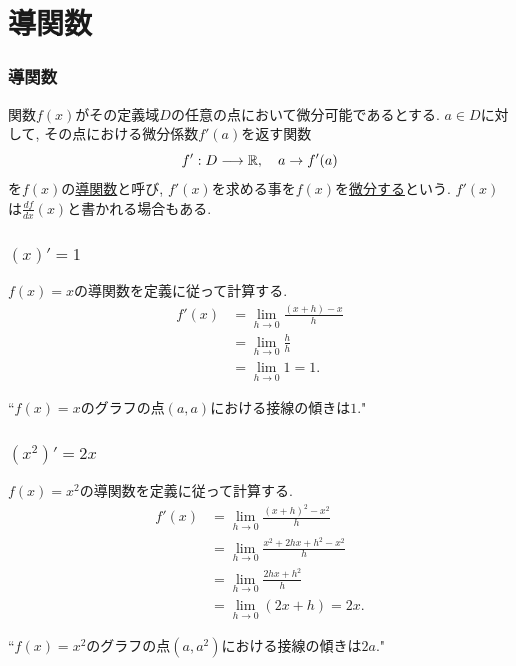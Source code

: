 \section{導関数}

\begin{frame}
\frametitle{導関数}


\begin{Def}
関数$f(x)$がその定義域$D$の任意の点において微分可能であるとする. 
$a \in D$に対して, その点における微分係数$f'(a)$を返す関数
$$
f':D \longrightarrow \mathbb{R}, \ \ \ a \to f'(a)
$$
を$f(x)$の\underline{導関数}と呼び, $f'(x)$を求める事を$f(x)$を\underline{微分する}という.  
$f'(x)$は$\frac{df}{dx}(x)$と書かれる場合もある. 
\end{Def}

\end{frame}




\begin{frame}
\frametitle{$(x)'=1$}


$f(x)=x$の導関数を定義に従って計算する. 
\begin{align*}
f'(x) & = \lim_{h\to 0} \frac{(x+h)-x}{h} \\
& =  \lim_{h\to 0} \frac{h}{h} \\
& =  \lim_{h\to 0} 1=1. 
\end{align*}

``$f(x)=x$のグラフの点$(a,a)$における接線の傾きは$1$." 

\end{frame}




\begin{frame}
\frametitle{$(x^2)'=2x$}


$f(x)=x^2$の導関数を定義に従って計算する. 
\begin{align*}
f'(x) & = \lim_{h\to 0} \frac{(x+h)^2-x^2}{h} \\
& =  \lim_{h\to 0} \frac{x^2+2hx+h^2-x^2}{h} \\
& =  \lim_{h\to 0} \frac{2hx+h^2}{h} \\
& =  \lim_{h\to 0} (2x+h) =2x. 
\end{align*}

``$f(x)=x^2$のグラフの点$(a,a^2)$における接線の傾きは$2a$." 

\end{frame}



